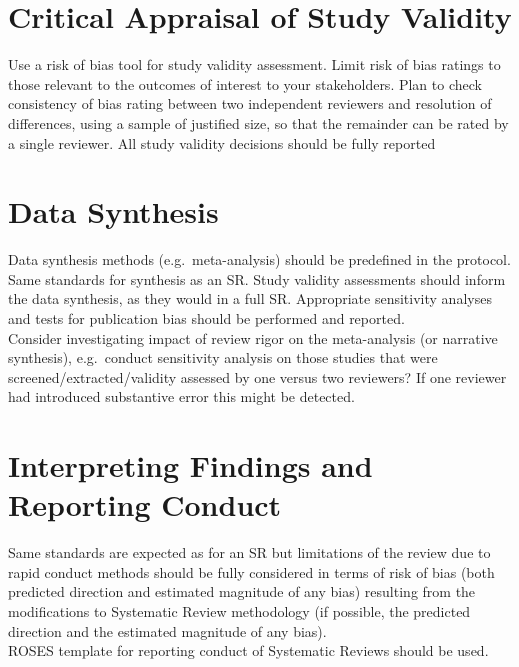 \documentclass[
  letterpaper,
  DIV=11,
  numbers=noendperiod]{scrreprt}
\begin{document}
\section{\texorpdfstring{\textbf{Critical Appraisal of Study
Validity}}{Critical Appraisal of Study Validity}}\label{critical-appraisal-of-study-validity}

Use a risk of bias tool for study validity assessment. Limit risk of
bias ratings to those relevant to the outcomes of interest to your
stakeholders. Plan to check consistency of bias rating between two
independent reviewers and resolution of differences, using a sample of
justified size, so that the remainder can be rated by a single reviewer.
All study validity decisions should be fully reported

\section{Data Synthesis}\label{data-synthesis}

Data synthesis methods (e.g.~meta-analysis) should be predefined in the
protocol. Same standards for synthesis as an SR. Study validity
assessments should inform the data synthesis, as they would in a full
SR. Appropriate sensitivity analyses and tests for publication bias
should be performed and reported.\\
Consider investigating impact of review rigor on the meta-analysis (or
narrative synthesis), e.g.~conduct sensitivity analysis on those studies
that were screened/extracted/validity assessed by one versus two
reviewers? If one reviewer had introduced substantive error this might
be detected.

\section{Interpreting Findings and Reporting
Conduct}\label{interpreting-findings-and-reporting-conduct}

Same standards are expected as for an SR but limitations of the review
due to rapid conduct methods should be fully considered in terms of risk
of bias (both predicted direction and estimated magnitude of any bias)
resulting from the modifications to Systematic Review methodology (if
possible, the predicted direction and the estimated magnitude of any
bias).\\
ROSES template for reporting conduct of Systematic Reviews should be
used.

\end{document}
